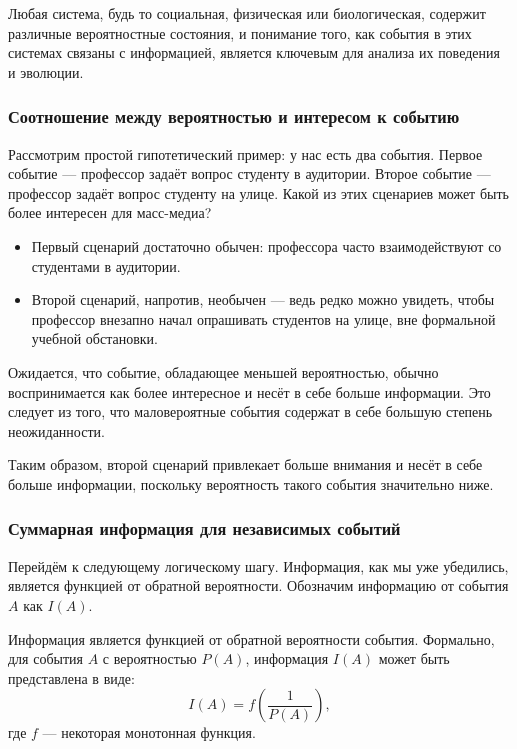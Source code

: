 \documentclass[12pt,a4paper]{article}
\newenvironment{defbox}[1][]{%
  \begin{tcolorbox}[enhanced, breakable, colback=defcolor, colframe=green!50!black, title=#1, fonttitle=\bfseries, arc=3pt, boxrule=0.5pt]
}{\end{tcolorbox}}
\newenvironment{rembox}[1][]{%
  \begin{tcolorbox}[enhanced, breakable, colback=gray!5, colframe=gray!50, title=#1, fonttitle=\bfseries, arc=3pt, boxrule=0.5pt]
}{\end{tcolorbox}}
\begin{document}
Любая система, будь то социальная, физическая или биологическая, содержит различные вероятностные состояния, и понимание того, как события в этих системах связаны с информацией, является ключевым для анализа их поведения и эволюции.
\subsubsection{Соотношение между вероятностью и интересом к событию}

Рассмотрим простой гипотетический пример: у нас есть два события. Первое событие — профессор задаёт вопрос студенту в аудитории. Второе событие — профессор задаёт вопрос студенту на улице. Какой из этих сценариев может быть более интересен для масс-медиа?

\begin{itemize}
    \item Первый сценарий достаточно обычен: профессора часто взаимодействуют со студентами в аудитории.
    \item Второй сценарий, напротив, необычен — ведь редко можно увидеть, чтобы профессор внезапно начал опрашивать студентов на улице, вне формальной учебной обстановки.
\end{itemize}

\begin{rembox}[Интересность события]
Ожидается, что событие, обладающее меньшей вероятностью, обычно воспринимается как более интересное и несёт в себе больше информации. Это следует из того, что маловероятные события содержат в себе большую степень неожиданности.
\end{rembox}

Таким образом, второй сценарий привлекает больше внимания и несёт в себе больше информации, поскольку вероятность такого события значительно ниже.

\subsubsection{Суммарная информация для независимых событий}

Перейдём к следующему логическому шагу. Информация, как мы уже убедились, является функцией от обратной вероятности. Обозначим информацию от события $A$ как $I(A)$.

\begin{defbox}[Функция информации]
Информация является функцией от обратной вероятности события. Формально, для события $A$ с вероятностью $P(A)$, информация $I(A)$ может быть представлена в виде:
\[
I(A) = f\left( \frac{1}{P(A)} \right),
\]
где $f$ — некоторая монотонная функция.
\end{defbox}
\end{document}
